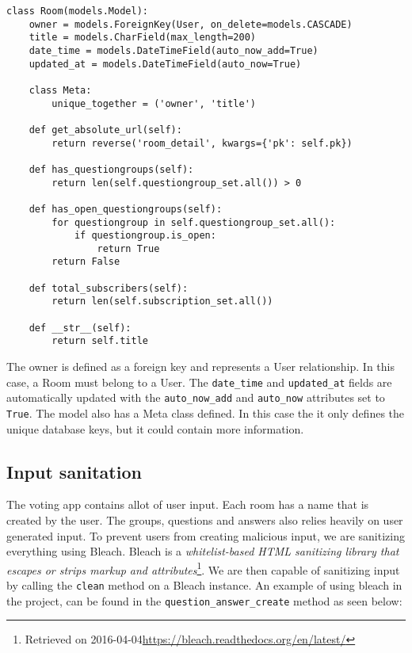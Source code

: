\begin{lstlisting}[caption=The Room Model, label=lst:room-model]
class Room(models.Model):
    owner = models.ForeignKey(User, on_delete=models.CASCADE)
    title = models.CharField(max_length=200)
    date_time = models.DateTimeField(auto_now_add=True)
    updated_at = models.DateTimeField(auto_now=True)

    class Meta:
        unique_together = ('owner', 'title')

    def get_absolute_url(self):
        return reverse('room_detail', kwargs={'pk': self.pk})

    def has_questiongroups(self):
        return len(self.questiongroup_set.all()) > 0

    def has_open_questiongroups(self):
        for questiongroup in self.questiongroup_set.all():
            if questiongroup.is_open:
                return True
        return False

    def total_subscribers(self):
        return len(self.subscription_set.all())

    def __str__(self):
        return self.title
\end{lstlisting}


The owner is defined as a foreign key and represents a User relationship. In this case, a Room must belong to a User. The \texttt{date\_time} and \texttt{updated\_at} fields are automatically updated with the \texttt{auto\_now\_add} and \texttt{auto\_now} attributes set to \texttt{True}. The model also has a Meta class defined. In this case the it only defines the unique database keys, but it could contain more information.


\subsection{Input sanitation}
The voting app contains allot of user input. Each room has a name that is created by the user. The groups, questions and answers also relies heavily on user generated input. To prevent users from creating malicious input, we are sanitizing everything using Bleach. Bleach is a \emph{whitelist-based HTML sanitizing library that escapes or strips markup and attributes}\footnote{Retrieved on 2016-04-04\url{https://bleach.readthedocs.org/en/latest/}}. We are then capable of sanitizing input by calling the \texttt{clean} method on a Bleach instance. An example of using bleach in the project, can be found in the \texttt{question\_answer\_create} method as seen below:

